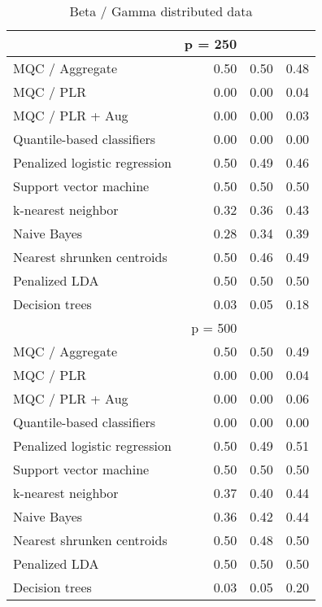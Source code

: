 \begin{table}[p]
\begin{minipage}{0.49\textwidth}
{\begin{tabular}{lrrr}
        \hline
        & p = 250 \\
        \hline

        MQC / Aggregate & 0.50 & 0.50 & 0.48 \\ 
        MQC / PLR & 0.00 & 0.00 & 0.04 \\ 
        MQC / PLR + Aug & 0.00 & 0.00 & 0.03 \\ 
        Quantile-based classifiers & 0.00 & 0.00 & 0.00 \\ 
        Penalized logistic regression & 0.50 & 0.49 & 0.46 \\ 
        Support vector machine & 0.50 & 0.50 & 0.50 \\ 
        k-nearest neighbor & 0.32 & 0.36 & 0.43 \\ 
        Naive Bayes & 0.28 & 0.34 & 0.39 \\ 
        Nearest shrunken centroids & 0.50 & 0.46 & 0.49 \\ 
        Penalized LDA & 0.50 & 0.50 & 0.50 \\ 
        Decision trees & 0.03 & 0.05 & 0.18 \\[2ex]

        \hline
        & p = 500 \\
        \hline

        MQC / Aggregate & 0.50 & 0.50 & 0.49 \\ 
        MQC / PLR & 0.00 & 0.00 & 0.04 \\ 
        MQC / PLR + Aug & 0.00 & 0.00 & 0.06 \\ 
        Quantile-based classifiers & 0.00 & 0.00 & 0.00 \\ 
        Penalized logistic regression & 0.50 & 0.49 & 0.51 \\ 
        Support vector machine & 0.50 & 0.50 & 0.50 \\ 
        k-nearest neighbor & 0.37 & 0.40 & 0.44 \\ 
        Naive Bayes & 0.36 & 0.42 & 0.44 \\ 
        Nearest shrunken centroids & 0.50 & 0.48 & 0.50 \\ 
        Penalized LDA & 0.50 & 0.50 & 0.50 \\ 
        Decision trees & 0.03 & 0.05 & 0.20 \\ 
        \hline
      \end{tabular}
    }
  \end{minipage}

  \caption{Beta / Gamma distributed data}
  \label{tab:beta-gamma}
\end{table}




